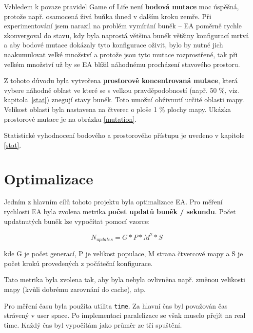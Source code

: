 \documentclass[12pt]{article}
\begin{document}
Vzhledem k povaze pravidel Game of Life není \textbf{bodová mutace} moc úspěšná, protože např. osamocená živá buňka ihned v dalším kroku zemře. Při experimentování jsem narazil na problém vymírání buněk -- EA poměrně rychle zkonvergoval do stavu, kdy byla naprostá většina buněk většiny konfigurací mrtvá a aby bodové mutace dokázaly tyto konfigurace oživit, bylo by nutné jich naakumulovat velké množství a protože jsou tyto mutace rozprostřené, tak při velkém množství už by se EA blížil náhodnému procházení stavového prostoru.

Z tohoto důvodu byla vytvořena \textbf{prostorově koncentrovaná mutace}, která vybere náhodně oblast ve které se s velkou pravděpodobností (např. 50 \%, viz. kapitola~\ref{stat}) znegují stavy buněk. Toto umožní obživnutí určité oblasti mapy. Velikost oblasti byla nastavena na čtverec o ploše 1 \% plochy mapy. Ukázka prostorové mutace je na obrázku \ref{mutation}.

Statistické vyhodnocení bodového a prostorového přístupu je uvedeno v kapitole \ref{stat}.

\section{Optimalizace}
Jedním z hlavním cílů tohoto projektu byla optimalizace EA. Pro měření rychlosti EA byla zvolena metrika \textbf{počet updatů buněk / sekundu}. Počet updatnutých buněk lze vypočítat pomocí vzorce:

\[N_{updates} = G * P * M^2 * S\]

kde G je počet generací, P je velikost populace, M strana čtvercové mapy a S je počet kroků provedených z počáteční konfigurace.

Tato metrika byla zvolena tak, aby byla nebyla ovlivněna např. změnou velikosti mapy (kvůli dobrému zarovnání do cache), atp.

Pro měření času byla použita utilita \texttt{time}. Za hlavní čas byl považován čas strávený v user space. Po implementaci paralelizace se však muselo přejít na real time. Každý čas byl vypočítám jako průměr ze tří spuštění.
\end{document}
